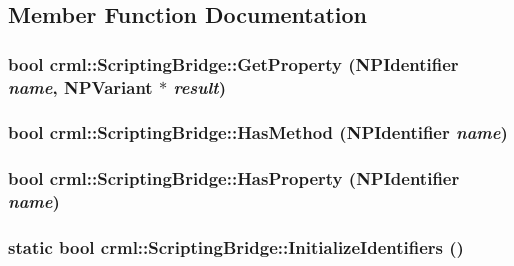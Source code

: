 \subsection{Member Function Documentation}
\hypertarget{classcrml_1_1_scripting_bridge_a9e52acfa32559fa8dfa41cf2898a1ba6}{
\subsubsection[{GetProperty}]{\setlength{\rightskip}{0pt plus 5cm}bool crml::ScriptingBridge::GetProperty ({\bf NPIdentifier} {\em name}, \/  {\bf NPVariant} $\ast$ {\em result})}}
\label{classcrml_1_1_scripting_bridge_a9e52acfa32559fa8dfa41cf2898a1ba6}
\hypertarget{classcrml_1_1_scripting_bridge_aa8546ab90cbe399399733a53495ec9b3}{
\subsubsection[{HasMethod}]{\setlength{\rightskip}{0pt plus 5cm}bool crml::ScriptingBridge::HasMethod ({\bf NPIdentifier} {\em name})}}
\label{classcrml_1_1_scripting_bridge_aa8546ab90cbe399399733a53495ec9b3}
\hypertarget{classcrml_1_1_scripting_bridge_a349e22860ef3ce03412e1914cccc12ba}{
\subsubsection[{HasProperty}]{\setlength{\rightskip}{0pt plus 5cm}bool crml::ScriptingBridge::HasProperty ({\bf NPIdentifier} {\em name})}}
\label{classcrml_1_1_scripting_bridge_a349e22860ef3ce03412e1914cccc12ba}
\hypertarget{classcrml_1_1_scripting_bridge_a578877afcfdf32ca1330732bbf6739ad}{
\subsubsection[{InitializeIdentifiers}]{\setlength{\rightskip}{0pt plus 5cm}static bool crml::ScriptingBridge::InitializeIdentifiers ()}}
